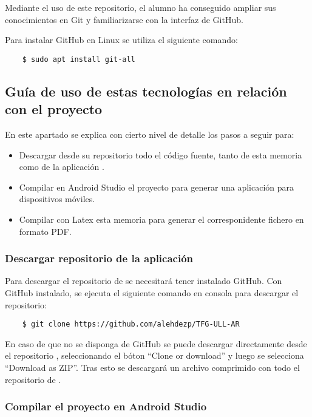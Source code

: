Mediante el uso de este repositorio, el alumno ha conseguido ampliar sus conocimientos en Git y familiarizarse con la interfaz de GitHub.

Para instalar GitHub en Linux se utiliza el siguiente comando:
\begin{lstlisting}
    $ sudo apt install git-all
\end{lstlisting}

\subsection{Guía de uso de estas tecnologías en relación con el proyecto \ULLAR{}}
En este apartado se explica con cierto nivel de detalle los pasos a seguir para:
\begin{itemize}
\item Descargar desde su repositorio todo el código fuente, tanto de esta memoria como de la aplicación \ULLAR{}.
\item Compilar en Android Studio el proyecto \ULLAR{} para generar una aplicación para dispositivos móviles.
\item Compilar con Latex esta memoria para generar el corresponidente fichero en formato PDF.
\end{itemize}

\subsubsection{Descargar repositorio de la aplicación}

Para descargar el repositorio de \ULLAR{} se necesitará tener instalado GitHub. Con GitHub instalado, se ejecuta el siguiente comando en consola para descargar el repositorio:

\begin{lstlisting}
    $ git clone https://github.com/alehdezp/TFG-ULL-AR 
\end{lstlisting}

En caso de que no se disponga de GitHub se puede descargar directamente desde el repositorio \cite{URL::repositorioAplicacion}, seleccionando el bóton ``Clone or download'' y luego se selecciona ``Download as ZIP''. Tras esto se descargará un archivo comprimido con todo el repositorio de \ULLAR{}.


\subsubsection{Compilar el proyecto en Android Studio}

